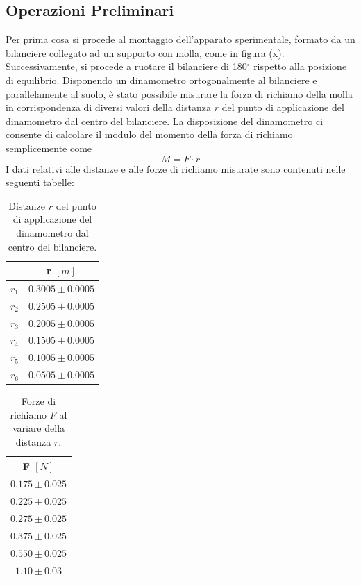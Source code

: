\subsection{Operazioni Preliminari}
Per prima cosa si procede al montaggio dell'apparato sperimentale, formato da un bilanciere collegato ad un supporto con molla, come in figura (x). Successivamente, si procede a ruotare il bilanciere di 180\(^\circ\) rispetto alla posizione di equilibrio. Disponendo un dinamometro ortogonalmente al bilanciere e parallelamente al suolo, è stato possibile misurare la forza di richiamo della molla in corrispondenza di diversi valori della distanza $r$ del punto di applicazione del dinamometro dal centro del bilanciere. La disposizione del dinamometro ci consente di calcolare il modulo del momento della forza di richiamo semplicemente come 
\begin{equation}
    M = F \cdot r
\end{equation}
I dati relativi alle distanze e alle forze di richiamo misurate sono contenuti nelle seguenti tabelle:

\begin{table}[H]
	\centering
	\begin{tabular}{|c|c|}
		\hline
		& \textbf{r $[m]$ } \\
		\hline
		  $r_1$ & $0.3005\pm 0.0005$ \\
		$r_2$ & $0.2505\pm 0.0005$ \\
		$r_3$ & $0.2005\pm 0.0005$ \\
		$r_4$ & $0.1505\pm 0.0005$ \\
		$r_5$ & $0.1005\pm 0.0005$ \\
            $r_6$ & $0.0505 \pm 0.0005$ \\
		\hline
	\end{tabular}
	\caption{Distanze $r$ del punto di applicazione del dinamometro dal centro del bilanciere.}
	\label{tab:}
\end{table}

\begin{table}[H]
	\centering
	\begin{tabular}{|c|}
		\hline
		\textbf{F $[N]$} \\
		\hline
		$0.175\pm 0.025$ \\
		$0.225\pm 0.025$ \\
		$0.275\pm 0.025$ \\
		$0.375\pm 0.025$ \\
		$0.550\pm 0.025$ \\
            $1.10 \pm 0.03$ \\
		\hline
	\end{tabular}
	\caption{Forze di richiamo $F$ al variare della distanza $r$.}
	\label{tab:}
\end{table}

